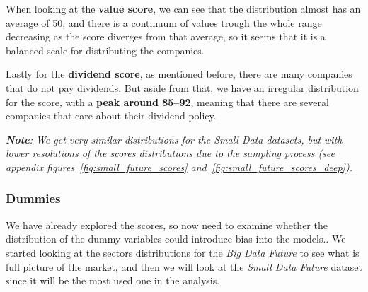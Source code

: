 \documentclass[11pt,english,a4paper,hidelinks]{book}
\begin{document}
\vspace{0.5cm}
\noindent When looking at the \textbf{value score}, we can see that the distribution almost has an average of 50, and there is a continuum of values trough the whole range decreasing as the score diverges from that average, so it seems that it is a balanced scale for distributing the companies.

\vspace{0.5cm}
\noindent Lastly for the \textbf{dividend score}, as mentioned before, there are many companies that do not pay dividends. But aside from that, we have an irregular distribution for the score, with a \textbf{peak around 85--92}, meaning that there are several companies that care about their dividend policy.

\vspace{0.5cm}
\noindent \textit{\textbf{Note}: We get very similar distributions for the Small Data datasets, but with lower resolutions of the scores distributions due to the sampling process (see appendix figures~\ref{fig:small_future_scores} and~\ref{fig:small_future_scores_deep}).}

\subsubsection{Dummies}

We have already explored the scores, so now need to examine whether the distribution of the dummy variables could introduce bias into the models.. We started looking at the sectors distributions for the \textit{Big Data Future} to see what is full picture of the market, and then we will look at the \textit{Small Data Future} dataset since it will be the most used one in the analysis.
\end{document}
